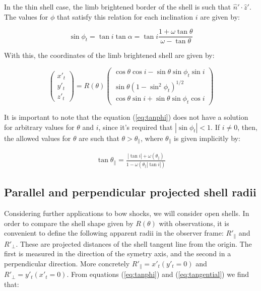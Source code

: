 In the thin shell case, the limb brightened border of the shell is such that $\hat{n}'\cdot \hat{z}'$. 
The values for $\phi$ that satisfy this relation for each inclination $i$ are given by:

\begin{equation}
\sin\phi_t = \tan i\tan\alpha = \tan i \frac{1+\omega\tan\theta}{\omega-\tan\theta}
\label{eq:tanphi}
\end{equation}

With this, the coordinates of the limb brightened shell are given by:

\begin{equation}
\left(\begin{array}{c}
x'_t \\ y'_t \\ z'_t
\end{array}\right)= R(\theta)\left(\begin{array}{c}
\cos\theta\cos i - \sin\theta\sin\phi_t \sin i \\
\sin\theta(1-\sin^2\phi_t)^{1/2} \\
\cos\theta\sin i +\sin\theta\sin\phi_t\cos i
\end{array}\right)
\label{eq:tangential}
\end{equation} 

It is important to note that the equation (\ref{eq:tanphi}) does not have a solution for arbitrary values for $\theta$ and $i$, since
it's required that $|\sin\phi_t|<1$. If $i\neq 0$, then, the  allowed values for $\theta$ are such that $\theta > \theta_\parallel$, where
$\theta_\parallel$ is given implicitly by:

\begin{align}
\tan\theta_\parallel = \frac{|\tan i| + \omega(\theta_\parallel)}{1-\omega(\theta_\parallel |\tan i|)}
\label{eq:thetapar}
\end{align}

\subsection{Parallel and perpendicular projected shell radii}

Considering further applications to bow shocks, we will consider open shells. In order to compare the shell shape given by $R(\theta)$ with observations,
it is convenient to define the following apparent radii in the observer frame: $R'_\parallel$ and $R'_\perp$. These are projected distances of the shell tangent line
from the origin. The first is measured in the direction of the symetry axis, and the second in a perpendicular direction. More concretely $R'_\parallel = x'_t(y'_t=0)$
and $R'_\perp = y'_t(x'_t=0)$. From equations (\ref{eq:tanphi}) and (\ref{eq:tangential}) we find that:

